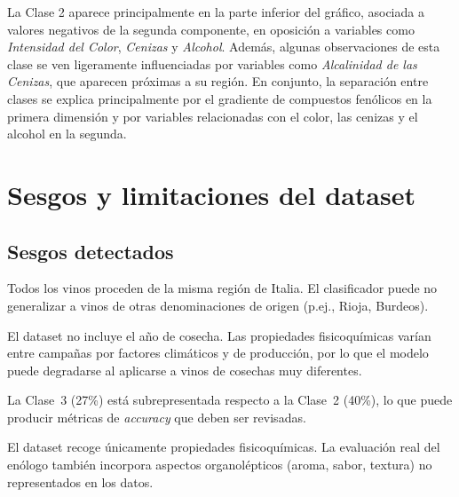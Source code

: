 La Clase 2 aparece principalmente en la parte inferior del gráfico, asociada a valores negativos de la segunda componente, en oposición a variables como \textit{Intensidad del Color}, \textit{Cenizas} y \textit{Alcohol}. Además, algunas observaciones de esta clase se ven ligeramente influenciadas por variables como \textit{Alcalinidad de las Cenizas}, que aparecen próximas a su región. En conjunto, la separación entre clases se explica principalmente por el gradiente de compuestos fenólicos en la primera dimensión y por variables relacionadas con el color, las cenizas y el alcohol en la segunda.


\section{Sesgos y limitaciones del dataset}

\subsection{Sesgos detectados}

\begin{description}[leftmargin=1.5cm, style=nextline]
    \item[Sesgo geogr\'afico.]
    Todos los vinos proceden de la misma regi\'on de Italia. El clasificador puede
    no generalizar a vinos de otras denominaciones de origen (p.ej., Rioja, Burdeos).

    \item[Sesgo temporal]
    El dataset no incluye el a\~no de cosecha. Las propiedades fisicoqu\'imicas
    var\'ian entre campa\~nas por factores clim\'aticos y de producci\'on, por lo que
    el modelo puede degradarse al aplicarse a vinos de cosechas muy diferentes.

    \item[Leve desbalanceo de clases.]
    La Clase~3 (27\%) est\'a subrepresentada respecto a la Clase~2 (40\%), lo que
    puede producir m\'etricas de \textit{accuracy} que deben ser revisadas.

    \item[Ausencia de variables sensoriales.]
    El dataset recoge \'unicamente propiedades fisicoqu\'imicas. La evaluaci\'on
    real del en\'ologo tambi\'en incorpora aspectos organol\'epticos (aroma, sabor,
    textura) no representados en los datos.
\end{description}

